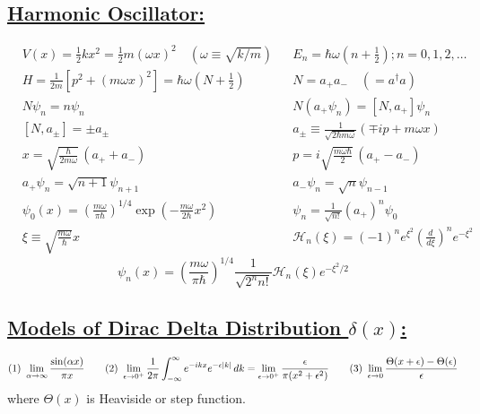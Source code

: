 \documentclass[a4paper,12pt]{article}
\begin{document}
\subsection*{\underline{Harmonic Oscillator:}}
\begin{align*}
    &V(x)=\frac{1}{2}kx^2=\frac{1}{2}m(\omega x)^2\quad \left( \omega\equiv\sqrt{k/m} \right)
    &
    &E_n=\hbar\omega\left( n+\frac{1}{2} \right);n=0,1,2,\dots
    \\
    &H=\frac{1}{2m}[p^2+(m\omega x)^2]=\hbar\omega\left( N+\frac{1}{2} \right)
    &
    &N=a_+a_-\quad (=a^\dagger a)
    \\
    &N\psi_n=n\psi_n
    &
    &N(a_+\psi_n)=[N,a_+]\psi_n
    \\
    &[N,a_\pm]=\pm a_\pm
    &
    &a_\pm\equiv \frac{1}{\sqrt{2\hbar m\omega}}\left( \mp ip+m\omega x \right)
    \\
    &x=\sqrt{\frac{\hbar}{2m\omega}}\,(a_++a_-)
    &
    &p=i\sqrt{\frac{m\omega\hbar}{2}}\,(a_+ - a_-)
    \\
    &a_+\psi_n=\sqrt{n+1}\psi_{n+1}
    &
    &a_-\psi_n=\sqrt{n}\psi_{n-1}
    \\
    &\psi_0(x)=\left( \frac{m\omega}{\pi\hbar} \right)^{1/4}\exp\left( -\frac{m\omega}{2\hbar}x^2 \right)
    &
    &\psi_n=\frac{1}{\sqrt{n!}}(a_+)^n\psi_0
    \\
    &\xi\equiv\sqrt{\frac{m\omega}{\hbar}}x
    &
    &\mathcal{H}_n(\xi)=(-1)^ne^{\xi^2}\left( \frac{d}{d\xi} \right)^ne^{-\xi^2}
\end{align*}
\begin{equation*}
    \psi_n(x)=\left( \frac{m\omega}{\pi\hbar} \right)^{1/4}\frac{1}{\sqrt{2^n n!}}\mathcal{H}_n(\xi)e^{-\xi^2/2}
\end{equation*}
\subsection*{\underline{Models of Dirac Delta Distribution $\delta(x)$:}}
\begin{equation*}
    (1)\ \lim_{\alpha\rightarrow\infty}\frac{\sin(\alpha x)}{\pi x}\\
    \qquad
    (2)\ \lim_{\epsilon\rightarrow0^+}\frac{1}{2\pi}\int_{-\infty}^{\infty}e^{-ikx}e^{-\epsilon |k|}\,dk=\lim_{\epsilon\rightarrow0^+}\frac{\epsilon}{\pi (x^2+\epsilon^2)}\\
    \qquad
    (3)\ \lim_{\epsilon\rightarrow0}\frac{\Theta(x+\epsilon)-\Theta(\epsilon)}{\epsilon}
\end{equation*}
where $\Theta(x)$ is Heaviside or step function. 
\end{document}
